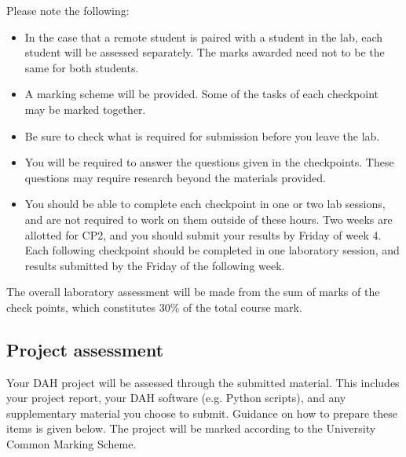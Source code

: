 Please note the following:
\begin{itemize}
\item In the case that a remote student is paired with a student in the lab, each student will be assessed separately. The marks awarded need not to be the same for both students. 
\item A marking scheme will be provided. Some of the tasks of each checkpoint may be marked together.
\item Be sure to check what is required for submission before you leave the lab.
\item You will be required to answer the questions given in the checkpoints. These questions may require research beyond the materials provided.
\item You should be able to complete each checkpoint in one or two lab sessions, and are not required to work on them outside of these hours. Two weeks are allotted for CP2, and you should submit your results by Friday of week 4. Each following checkpoint should be completed in one laboratory session, and results submitted by the Friday of the following week.
\end{itemize}

The overall laboratory assessment will be made from the sum of marks of the check points, which constitutes 30\% of the total course mark.

\subsection{Project assessment}

Your DAH project will be assessed through the submitted material.
This includes your project report, your DAH software (e.g. Python scripts), and any supplementary material you choose to submit.
Guidance on how to prepare these items is given below.
The project will be marked according to the University Common Marking Scheme. 

